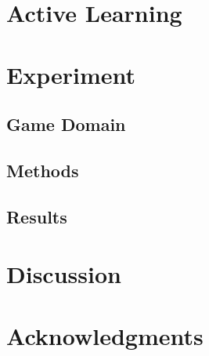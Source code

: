 \documentclass[letterpaper]{article}
\begin{document}
\cite{brochu2010:thesis}


\section{Active Learning}
\cite{settles2012:al-book}


\section{Experiment}

\subsection{Game Domain}


\subsection{Methods}


\subsection{Results}

\section{Discussion}




\section{Acknowledgments}



\end{document}
